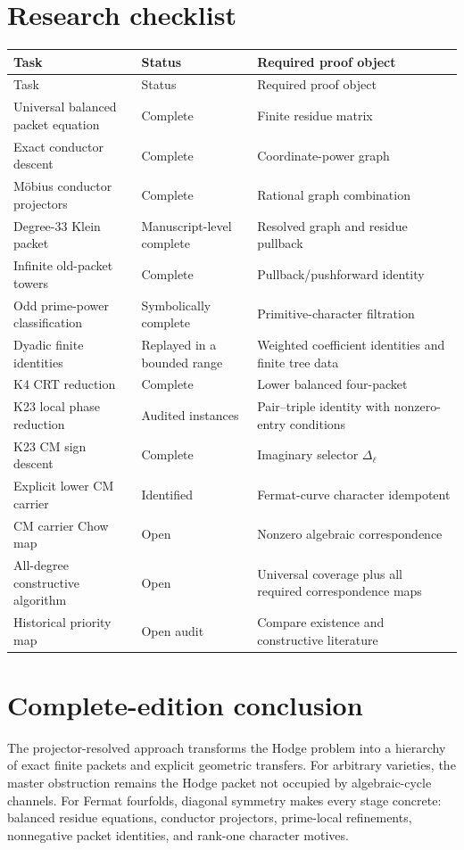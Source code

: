 \chapter{Research checklist}
\begin{longtable}{p{}p{}p{}}
\toprule
Task & Status & Required proof object \\
\midrule\endfirsthead
\toprule
Task & Status & Required proof object \\
\midrule\endhead
Universal balanced packet equation & Complete & Finite residue matrix \\
Exact conductor descent & Complete & Coordinate-power graph \\
M\"obius conductor projectors & Complete & Rational graph combination \\
Degree-33 Klein packet & Manuscript-level complete & Resolved graph and residue pullback \\
Infinite old-packet towers & Complete & Pullback/pushforward identity \\
Odd prime-power classification & Symbolically complete & Primitive-character filtration \\
Dyadic finite identities & Replayed in a bounded range & Weighted coefficient identities and finite tree data \\
K4 CRT reduction & Complete & Lower balanced four-packet \\
K23 local phase reduction & Audited instances & Pair--triple identity with nonzero-entry conditions \\
K23 CM sign descent & Complete & Imaginary selector $\Delta_\ell$ \\
Explicit lower CM carrier & Identified & Fermat-curve character idempotent \\
CM carrier Chow map & Open & Nonzero algebraic correspondence \\
All-degree constructive algorithm & Open & Universal coverage plus all required correspondence maps \\
Historical priority map & Open audit & Compare existence and constructive literature \\
\bottomrule
\end{longtable}

\chapter{Complete-edition conclusion}
The projector-resolved approach transforms the Hodge problem into a hierarchy of exact finite packets and explicit geometric transfers. For arbitrary varieties, the master obstruction remains the Hodge packet not occupied by algebraic-cycle channels. For Fermat fourfolds, diagonal symmetry makes every stage concrete: balanced residue equations, conductor projectors, prime-local refinements, nonnegative packet identities, and rank-one character motives.

